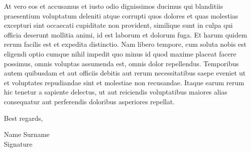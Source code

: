 \documentclass[a4paper,10pt]{article}
\begin{document}
At vero eos et accusamus et iusto odio dignissimos ducimus qui blanditiis praesentium voluptatum deleniti atque corrupti quos dolores et quas molestias excepturi sint occaecati cupiditate non provident, similique sunt in culpa qui officia deserunt mollitia animi, id est laborum et dolorum fuga. Et harum quidem rerum facilis est et expedita distinctio. Nam libero tempore, cum soluta nobis est eligendi optio cumque nihil impedit quo minus id quod maxime placeat facere possimus, omnis voluptas assumenda est, omnis dolor repellendus. Temporibus autem quibusdam et aut officiis debitis aut rerum necessitatibus saepe eveniet ut et voluptates repudiandae sint et molestiae non recusandae. Itaque earum rerum hic tenetur a sapiente delectus, ut aut reiciendis voluptatibus maiores alias consequatur aut perferendis doloribus asperiores repellat.

\vspace{12pt}

Best regards,

Name Surname\\
Signature
\end{document}
